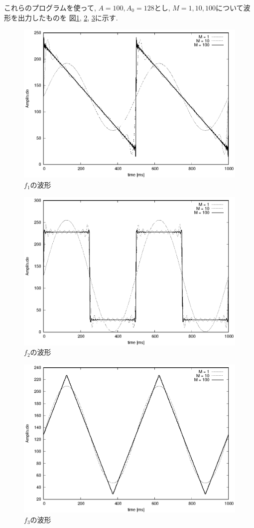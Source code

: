 \documentclass[titlepage]{jsarticle}
\begin{document}
    これらのプログラムを使って, $A = 100, A_0 = 128$とし, $M = 1, 10, 100$について波形を出力したものを
    図\ref{fig:f1}, \ref{fig:f2}, \ref{fig:f3}に示す.

    \begin{figure}[h]
        \centering
        \includegraphics[width=0.8\hsize]{images/f1.eps}
        \caption{$f_1$の波形}
        \label{fig:f1}
    \end{figure}

    \begin{figure}[h]
        \centering
        \includegraphics[width=0.8\hsize]{images/f2.eps}
        \caption{$f_2$の波形}
        \label{fig:f2}
    \end{figure}

    \begin{figure}[h]
        \centering
        \includegraphics[width=0.8\hsize]{images/f3.eps}
        \caption{$f_3$の波形}
        \label{fig:f3}
    \end{figure}
\end{document}

